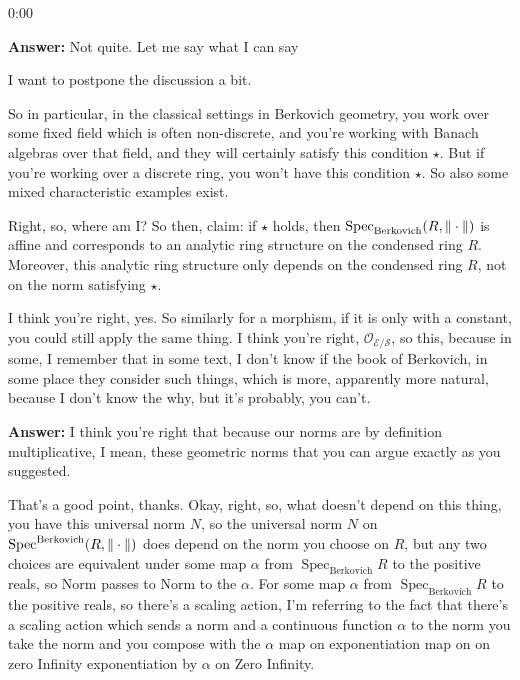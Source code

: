 \begin{unfinished}{0:00}
{%
\textbf{Answer:} Not quite. Let me say what I can say 

I want to postpone the discussion a bit.

So in particular, in the classical settings in Berkovich geometry, you work over some fixed field which is often non-discrete, and you're working with Banach algebras over that field, and they will certainly satisfy this condition $\star$. But if you're working over a discrete ring, you won't have this condition $\star$. 
So also some mixed characteristic examples exist.

Right, so, where am I? So then, claim: if $\star$ holds, then $\operatorname{Spec}_{\mathrm{Berkovich}} (R, \| \cdot \|)$ is affine and corresponds to an analytic ring structure on the condensed ring $R$. Moreover, this analytic ring structure only depends on the condensed ring $R$, not on the norm satisfying $\star$.

I think you're right, yes. So similarly for a morphism, if it is only with a constant, you could still apply the same thing. I think you're right, $\mathcal{O}_{\mathcal{E}/\mathcal{S}}$, so this, because in some, I remember that in some text, I don't know if the book of Berkovich, in some place they consider such things, which is more, apparently more natural, because I don't know the why, but it's probably, you can't.

\textbf{Answer:} I think you're right that because our norms are by definition multiplicative, I mean, these geometric norms that you can argue exactly as you suggested.

That's a good point, thanks. Okay, right, so, what doesn't depend on this thing, you have this universal norm $N$, so the universal norm $N$ on $\operatorname{Spec}^{\mathrm{Berkovich}} (R, \| \cdot \|)$ does depend on the norm you choose on $R$, but any two choices are equivalent under some map $\alpha$ from $\operatorname{Spec}_{\mathrm{Berkovich}} R$ to the positive reals, so Norm passes to Norm to the $\alpha$. For some map $\alpha$ from $\operatorname{Spec}_{\mathrm{Berkovich}} R$ to the positive reals, so there's a scaling action, I'm referring to the fact that there's a scaling action which sends a norm and a continuous function $\alpha$ to the norm you take the norm and you compose with the $\alpha$ map on exponentiation map on on zero Infinity exponentiation by $\alpha$ on Zero Infinity.

}
\end{unfinished}
